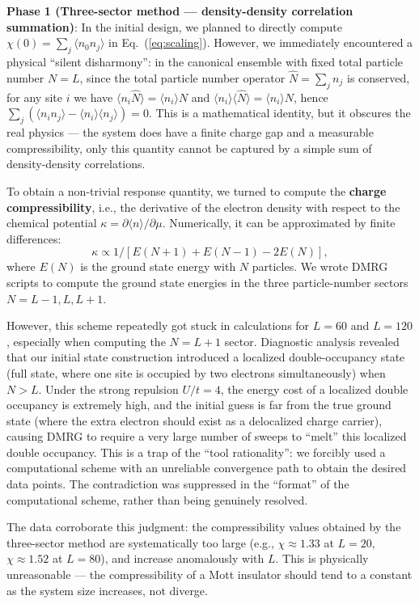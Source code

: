 \documentclass[prb,reprint,twocolumn,superscriptaddress]{revtex4-2}
\begin{document}
\textbf{Phase 1 (Three-sector method --- density-density correlation summation)}: In the initial design, we planned to directly compute $\chi(0) = \sum_j \langle n_0 n_j \rangle$ in Eq.~(\ref{eq:scaling}). However, we immediately encountered a physical ``silent disharmony'': in the canonical ensemble with fixed total particle number $N = L$, since the total particle number operator $\hat{N} = \sum_j n_j$ is conserved, for any site $i$ we have $\langle n_i \hat{N} \rangle = \langle n_i \rangle N$ and $\langle n_i \rangle \langle \hat{N} \rangle = \langle n_i \rangle N$, hence $\sum_j (\langle n_i n_j \rangle - \langle n_i \rangle \langle n_j \rangle) = 0$. This is a mathematical identity, but it obscures the real physics --- the system does have a finite charge gap and a measurable compressibility, only this quantity cannot be captured by a simple sum of density-density correlations.

To obtain a non-trivial response quantity, we turned to compute the \textbf{charge compressibility}, i.e., the derivative of the electron density with respect to the chemical potential $\kappa = \partial \langle n \rangle / \partial \mu$. Numerically, it can be approximated by finite differences:
\begin{equation}
\kappa \propto 1 / [E(N+1) + E(N-1) - 2E(N)],
\end{equation}
where $E(N)$ is the ground state energy with $N$ particles. We wrote DMRG scripts to compute the ground state energies in the three particle-number sectors $N = L-1, L, L+1$.

However, this scheme repeatedly got stuck in calculations for $L = 60$ and $L = 120$, especially when computing the $N = L+1$ sector. Diagnostic analysis revealed that our initial state construction introduced a localized double-occupancy state (full state, where one site is occupied by two electrons simultaneously) when $N > L$. Under the strong repulsion $U/t = 4$, the energy cost of a localized double occupancy is extremely high, and the initial guess is far from the true ground state (where the extra electron should exist as a delocalized charge carrier), causing DMRG to require a very large number of sweeps to ``melt'' this localized double occupancy. This is a trap of the ``tool rationality'': we forcibly used a computational scheme with an unreliable convergence path to obtain the desired data points. The contradiction was suppressed in the ``format'' of the computational scheme, rather than being genuinely resolved.

The data corroborate this judgment: the compressibility values obtained by the three-sector method are systematically too large (e.g., $\chi \approx 1.33$ at $L = 20$, $\chi \approx 1.52$ at $L = 80$), and increase anomalously with $L$. This is physically unreasonable --- the compressibility of a Mott insulator should tend to a constant as the system size increases, not diverge.
\end{document}
